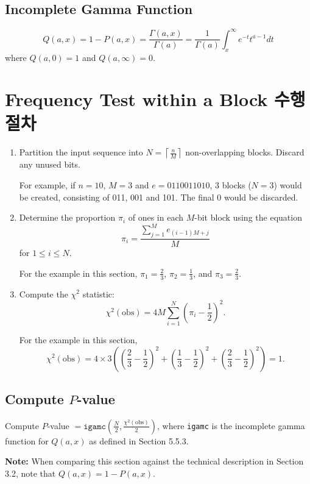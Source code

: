 \documentclass[12pt,openany]{book}
\theoremstyle{definition}
\begin{document}
	\subsection*{Incomplete Gamma Function}
	\[
	Q(a,x) = 1 - P(a,x) = \frac{\Gamma(a,x)}{\Gamma(a)} = \frac{1}{\Gamma(a)}\int_{x}^{\infty}e^{-t}t^{a-1}dt
	\]
	where \(Q(a,0) = 1\) and \(Q(a,\infty) = 0\).

	
	\section*{Frequency Test within a Block 수행 절차}
	
	\begin{enumerate}
		\item Partition the input sequence into \(N = \left\lceil \frac{n}{M} \right\rceil\) non-overlapping blocks. Discard any unused bits.
		
		For example, if \(n = 10\), \(M = 3\) and \(e = 0110011010\), 3 blocks (\(N = 3\)) would be created, consisting of 011, 001 and 101. The final 0 would be discarded.
		
		\item Determine the proportion \(\pi_i\) of ones in each \(M\)-bit block using the equation
		\[
		\pi_i = \frac{\sum_{j=1}^{M} e_{(i-1)M+j}}{M}
		\]
		for \(1 \leq i \leq N\).
		
		For the example in this section, \(\pi_1 = \frac{2}{3}\), \(\pi_2 = \frac{1}{3}\), and \(\pi_3 = \frac{2}{3}\).
		
		\item Compute the \(\chi^2\) statistic: 
		\[
		\chi^2(\text{obs}) = 4M \sum_{i=1}^{N} \left(\pi_i - \frac{1}{2}\right)^2.
		\]
		
		For the example in this section, 
		\[
		\chi^2(\text{obs}) = 4 \times 3 \left(\left(\frac{2}{3} - \frac{1}{2}\right)^2 + \left(\frac{1}{3} - \frac{1}{2}\right)^2 + \left(\frac{2}{3} - \frac{1}{2}\right)^2\right) = 1.
		\]
	\end{enumerate}

	\subsection*{Compute \( P \)-value}
	Compute \( P \)-value \( = \texttt{igamc} \left( \frac{N}{2}, \frac{\chi^2(\text{obs})}{2} \right) \), where \texttt{igamc} is the incomplete gamma function for \( Q(a,x) \) as defined in Section 5.5.3.
	
	\textbf{Note:} When comparing this section against the technical description in Section 3.2, note that \( Q(a,x) = 1 - P(a,x) \).
	
\end{document}
